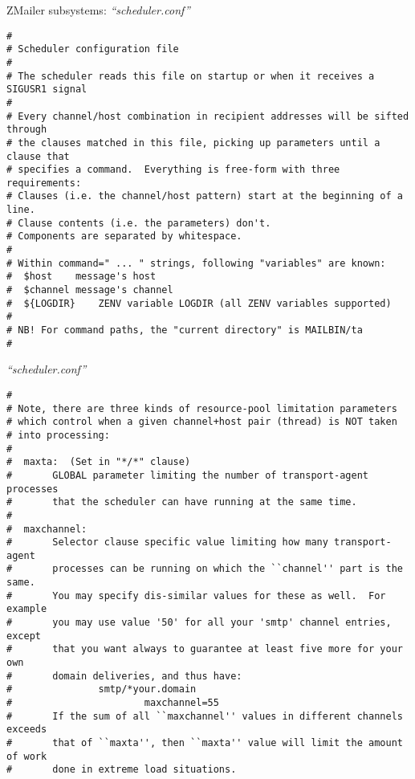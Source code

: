 \documentclass[a4paper,landscape]{slides}
\newcommand{\ZM}{ZMailer}
\begin{document}
\begin{overlay}

\centerline{\large \ZM{} subsystems: {\it ``scheduler.conf''}}

\tiny
\begin{verbatim}
#
# Scheduler configuration file
#
# The scheduler reads this file on startup or when it receives a SIGUSR1 signal
#
# Every channel/host combination in recipient addresses will be sifted through
# the clauses matched in this file, picking up parameters until a clause that
# specifies a command.  Everything is free-form with three requirements:
# Clauses (i.e. the channel/host pattern) start at the beginning of a line.
# Clause contents (i.e. the parameters) don't.
# Components are separated by whitespace.
# 
# Within command=" ... " strings, following "variables" are known:
#  $host	message's host
#  $channel	message's channel
#  ${LOGDIR}	ZENV variable LOGDIR (all ZENV variables supported)
#
# NB! For command paths, the "current directory" is MAILBIN/ta
#
\end{verbatim}
\vfill
\end{overlay}
\begin{overlay}
\small
\centerline{{\it ``scheduler.conf''}}
\tiny
\begin{verbatim}
#
# Note, there are three kinds of resource-pool limitation parameters
# which control when a given channel+host pair (thread) is NOT taken
# into processing:
#
#  maxta:  (Set in "*/*" clause)
#       GLOBAL parameter limiting the number of transport-agent processes
#       that the scheduler can have running at the same time.
#
#  maxchannel:
#       Selector clause specific value limiting how many transport-agent
#       processes can be running on which the ``channel'' part is the same.
#       You may specify dis-similar values for these as well.  For example
#       you may use value '50' for all your 'smtp' channel entries, except
#       that you want always to guarantee at least five more for your own
#       domain deliveries, and thus have:
#               smtp/*your.domain
#                       maxchannel=55
#       If the sum of all ``maxchannel'' values in different channels exceeds
#       that of ``maxta'', then ``maxta'' value will limit the amount of work
#       done in extreme load situations.
\end{verbatim}
\vfill
\end{overlay}
\end{document}
